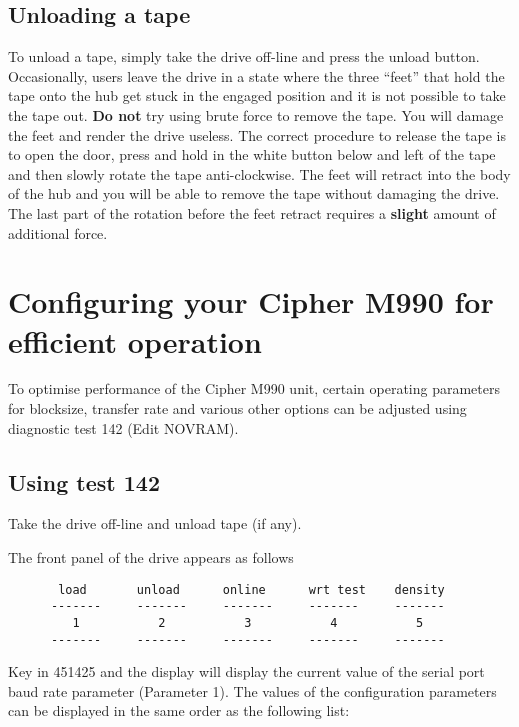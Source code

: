 \subsection{Unloading a tape}

To unload a tape, simply take the drive off-line and press the unload  button.
Occasionally, users leave the drive in a state where the three ``feet'' that hold
the tape onto the hub get stuck in the engaged position and it is not possible
to take the tape out. {\bf Do not} try using brute force to  remove the tape. You
will damage the feet and render the drive useless. The correct procedure to
release the tape is to open the door, press and hold in the white button below
and left of the tape and then slowly rotate the tape anti-clockwise. The feet will retract into
the body of the hub and you will be able to remove the tape without damaging
the drive. The last part of the rotation before the feet retract requires a
{\bf slight} amount of additional force.


\section{Configuring your Cipher M990 for efficient operation}

To optimise performance of the Cipher M990 unit, certain operating
parameters for blocksize, transfer rate and various other options can be
adjusted using diagnostic test 142 (Edit NOVRAM).

\subsection{Using test 142}

Take the drive off-line and unload tape (if any).

The front panel of the drive appears as follows

\begin{verbatim}
       load       unload      online      wrt test    density
      -------     -------     -------     -------     -------
         1           2           3           4           5
      -------     -------     -------     -------     -------
\end{verbatim}

Key in 451425 and the display will display the current value of the serial
port baud rate parameter (Parameter 1). The values of the configuration
parameters can be displayed in the same order as the following list:


